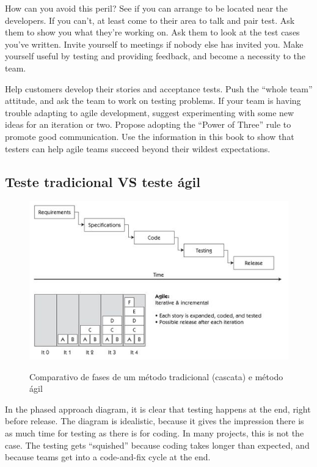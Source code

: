 \documentclass[
	12pt,				%
	openright,			%
	oneside,			%
	a4paper,			%
	english,			%
	brazil,				%
	]{abntex2}
\begin{document}
How can you avoid this peril? See if you can arrange to be located near the developers. If you can’t, at least come to their area to talk and pair test. Ask them to show you what they’re working on. Ask them to look at the test cases you’ve written. Invite yourself to meetings if nobody else has invited you. Make yourself useful by testing and providing feedback, and become a necessity to the team.

Help customers develop their stories and acceptance tests. Push the “whole team” attitude, and ask the team to work on testing problems. If your team is having trouble adapting to agile development, suggest experimenting with some new ideas for an iteration or two. Propose adopting the “Power of Three” rule to promote good communication. Use the information in this book to show that testers can help agile teams succeed beyond their wildest expectations.

\subsection{Teste tradicional VS teste ágil}

\begin{figure}[H]
    \centering
    \caption{Comparativo de fases de um método tradicional (cascata) e método ágil}
    \graphicspath{ {./graphics/agile/} }
    \includegraphics[scale=1.0]{waterfall-vs-agile}
    \label{fig:waterfall-vs-agile}
\end{figure}

In the phased approach diagram, it is clear that testing happens at the end, right before release. The diagram is idealistic, because it gives the impression there is as much time for testing as there is for coding. In many projects, this is not the case. The testing gets “squished” because coding takes longer than expected, and because teams get into a code-and-fix cycle at the end.
\end{document}

